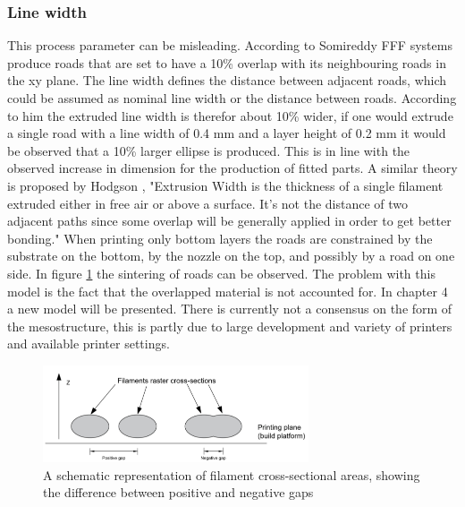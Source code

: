 \subsubsection{Line width}
This process parameter can be misleading. According to Somireddy \cite{Somireddy2017MechanicalMesostructure} FFF systems produce roads that are set to have a 10\% overlap with its neighbouring roads in the xy plane. The line width defines the distance between adjacent roads, which could be assumed as nominal line width or the distance between roads. According to him the extruded line width is therefor about 10\% wider, if one would extrude a single road with a line width of 0.4 mm and a layer height of 0.2 mm it would be observed that a 10\% larger ellipse is produced. 
This is in line with the observed increase in dimension for the production of fitted parts. A similar theory is proposed by Hodgson \cite{GaryHodgsonSlic3rMath}, "Extrusion Width is the thickness of a single filament extruded either in free air or above a surface. It's not the distance of two adjacent paths since some overlap will be generally applied in order to get better bonding."
When printing only bottom layers the roads are constrained by the substrate on the bottom, by the nozzle on the top, and possibly by a road on one side.  In figure \ref{fig:roadconnecting} the sintering of roads can be observed. The problem with this model is the fact that the overlapped material is not accounted for. In chapter 4 a new model will be presented. There is currently not a consensus on the form of the mesostructure, this is partly due to large development and  variety of printers and available printer settings.

\begin{figure}[htb]
    \centering
    \includegraphics[width=0.7\textwidth]{chapter_2/figures/roadconnecting.PNG}
    \caption{A schematic representation of filament cross-sectional areas, showing the difference between positive and negative gaps \cite{Cuan-Urquizo2019CharacterizationApproaches}}
    \label{fig:roadconnecting}
\end{figure}

